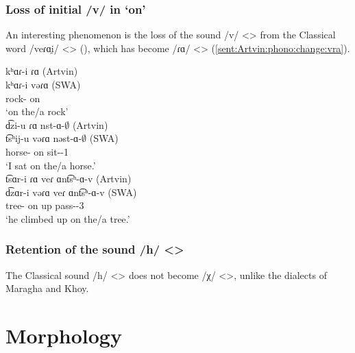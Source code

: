 \subsubsection{Loss of initial /v/ in `on'}

An interesting phenomenon is the loss of the sound /v/ <> from the Classical word /veɾɑi̯/ <> (), which has become /ɾɑ/ <> (\ref{sent:Artvin:phono:change:vra}). 

\begin{exe}
	\ex \label{sent:Artvin:phono:change:vra}
	\begin{xlist}
		\ex \glll 
		kʰɑɾ-i ɾɑ (Artvin) \\
		kʰɑɾ-i vəɾɑ (SWA) \\
		rock-{\gen} on \\
		\trans `on the/a rock' \\
		\ex \glll 
		d͡zi-u ɾɑ nst-ɑ-$\emptyset$ (Artvin) \\
		t͡sʰij-u vəɾɑ nəst-ɑ-$\emptyset$ (SWA) \\
		horse-{\gen} on sit-{\pst}-1{\sg} \\
		\trans `I sat on the/a horse.'\\
		\ex \glll t͡sɑr-i ɾɑ veɾ ɑnt͡sʰ-ɑ-v (Artvin) \\
		d͡zɑr-i vəɾɑ veɾ ɑnt͡sʰ-ɑ-v (SWA) \\ tree-{\gen} on up pass-{\pst}-3{\sg} \\
		\trans `he climbed up on the/a tree.' \\
		
		
	\end{xlist}
\end{exe}

\begin{adjarianpage}\label{page:292}\end{adjarianpage}%

\subsubsection{Retention of the sound /h/ <> }
The Classical sound /h/ <> does not become /χ/ <>, unlike the dialects of Maragha and Khoy.

\section{Morphology}
